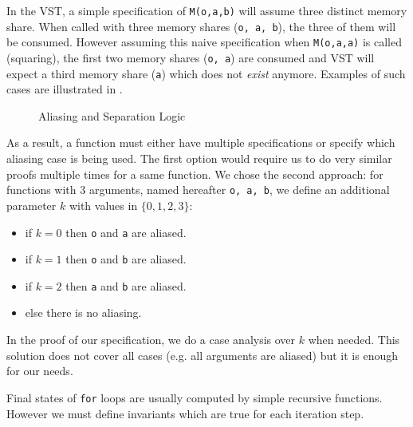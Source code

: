 
In the VST, a simple specification of \texttt{M(o,a,b)} will assume three
distinct memory share. When called with three memory shares (\texttt{o, a, b}),
the three of them will be consumed. However assuming this naive specification
when \texttt{M(o,a,a)} is called (squaring), the first two memory shares (\texttt{o, a})
are consumed and VST will expect a third memory share (\texttt{a}) which does not \emph{exist} anymore.
Examples of such cases are illustrated in .
\begin{figure}[h]
  \centering
  
  \caption{Aliasing and Separation Logic}
  \label{tikz:MemSame}
\end{figure}

As a result, a function must either have multiple specifications or specify which
aliasing case is being used.
The first option would require us to do very similar proofs multiple times for a same function.
We chose the second approach: for functions with 3 arguments, named hereafter \texttt{o, a, b},
we define an additional parameter $k$ with values in $\{0,1,2,3\}$:
\begin{itemize}
  \item if $k=0$ then \texttt{o} and \texttt{a} are aliased.
  \item if $k=1$ then \texttt{o} and \texttt{b} are aliased.
  \item if $k=2$ then \texttt{a} and \texttt{b} are aliased.
  \item else there is no aliasing.
\end{itemize}
In the proof of our specification, we do a case analysis over $k$ when needed.
This solution does not cover all cases (e.g. all arguments are aliased) but it
is enough for our needs.

Final states of \texttt{for} loops are usually computed by simple recursive functions.
However we must define invariants which are true for each iteration step.

